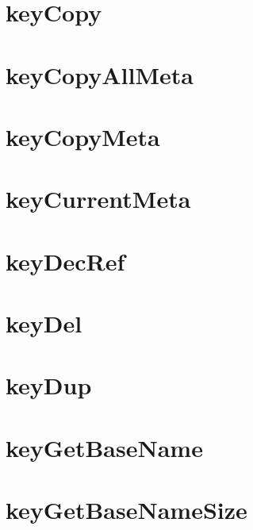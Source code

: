 \let\mypdfximage\pdfximage\def\pdfximage{\immediate\mypdfximage}\documentclass[twoside]{book}
\newcommand{\+}{\discretionary{\mbox{\scriptsize$\hookleftarrow$}}{}{}}
\begin{document}
\chapter{key\+Copy}
\label{doc_api_review_core_keyCopy_md}

\chapter{key\+Copy\+All\+Meta}
\label{doc_api_review_core_keyCopyAllMeta_md}

\chapter{key\+Copy\+Meta}
\label{doc_api_review_core_keyCopyMeta_md}

\chapter{key\+Current\+Meta}
\label{doc_api_review_core_keyCurrentMeta_md}

\chapter{key\+Dec\+Ref}
\label{doc_api_review_core_keyDecRef_md}

\chapter{key\+Del}
\label{doc_api_review_core_keyDel_md}

\chapter{key\+Dup}
\label{doc_api_review_core_keyDup_md}

\chapter{key\+Get\+Base\+Name}
\label{doc_api_review_core_keyGetBaseName_md}

\chapter{key\+Get\+Base\+Name\+Size}
\label{doc_api_review_core_keyGetBaseNameSize_md}

\end{document}

